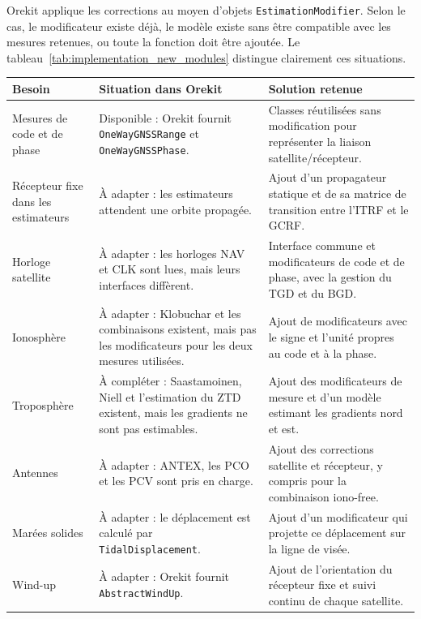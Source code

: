 Orekit applique les corrections au moyen d'objets
\texttt{EstimationModifier}. Selon le cas, le modificateur existe déjà, le
modèle existe sans être compatible avec les mesures retenues, ou toute la
fonction doit être ajoutée. Le tableau~\ref{tab:implementation_new_modules}
distingue clairement ces situations.

\begin{table}[htbp]
\centering
\small
\begin{tabularx}{\textwidth}{|>{\raggedright\arraybackslash}p{}|
                                  >{\raggedright\arraybackslash}p{}|
                                  >{\raggedright\arraybackslash}X|}
\hline
\textbf{Besoin} & \textbf{Situation dans Orekit} &
\textbf{Solution retenue} \\
\hline
Mesures de code et de phase & Disponible : Orekit fournit
\texttt{OneWayGNSSRange} et \texttt{OneWayGNSSPhase}. & Classes réutilisées
sans modification pour représenter la liaison satellite/récepteur. \\
\hline
Récepteur fixe dans les estimateurs & À adapter : les estimateurs
attendent une orbite propagée. & Ajout d'un propagateur statique et de sa
matrice de transition entre l'ITRF et le GCRF. \\
\hline
Horloge satellite & À adapter : les horloges NAV et CLK sont lues,
mais leurs interfaces diffèrent. & Interface commune et modificateurs de code
et de phase, avec la gestion du TGD et du BGD. \\
\hline
Ionosphère & À adapter : Klobuchar et les combinaisons existent, mais
pas les modificateurs pour les deux mesures utilisées. & Ajout de modificateurs
avec le signe et l'unité propres au code et à la phase. \\
\hline
Troposphère & À compléter : Saastamoinen, Niell et l'estimation du ZTD
existent, mais les gradients ne sont pas estimables. & Ajout des
modificateurs de mesure et d'un modèle estimant les gradients nord et est. \\
\hline
Antennes & À adapter : ANTEX, les PCO et les PCV sont pris en charge. &
Ajout des corrections satellite et récepteur, y compris pour la combinaison
iono-free. \\
\hline
Marées solides & À adapter : le déplacement est calculé par
\texttt{TidalDisplacement}. & Ajout d'un modificateur qui projette ce
déplacement sur la ligne de visée. \\
\hline
Wind-up & À adapter : Orekit fournit \texttt{AbstractWindUp}. & Ajout
de l'orientation du récepteur fixe et suivi continu de chaque satellite. \\

\end{tabularx}
\end{table}
